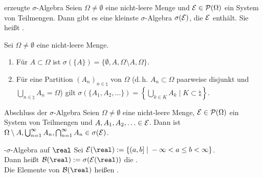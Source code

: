 \begin{Def}{erzeugte $\sigma$-Algebra}
    Seien $\Omega \not= \emptyset$ eine nicht-leere Menge und $\mathcal{E} \in \mathcal{P}(\Omega)$ ein
    System von Teilmengen.
    Dann gibt es eine kleinste $\sigma$-Algebra $\sigma(\mathcal{E})$, die $\mathcal{E}$ enthält.
    Sie heißt .
\end{Def}

\begin{Bsp}
    Sei $\Omega \not= \emptyset$ eine nicht-leere Menge.
    \begin{enumerate}
        \item
        Für $A \subset \Omega$ ist $\sigma(\{A\}) = \{\emptyset, A, \Omega \setminus A, \Omega\}$.

        \item
        Für eine Partition $(A_n)_{n \in \natural}$ von $\Omega$
        (d.\,h. $A_n \subset \Omega$ paarweise disjunkt und
        $\bigcup_{n \in \natural} A_n = \Omega$) gilt
        $\sigma(\{A_1, A_2, \dotsc\}) = \left\{\bigcup_{k \in K} A_k \;|\;
        K \subset \natural\right\}$.
    \end{enumerate}
\end{Bsp}

\begin{Satz}{Abschluss der $\sigma$-Algebra}
    Seien $\Omega \not= \emptyset$ eine nicht-leere Menge, $\mathcal{E} \in \mathcal{P}(\Omega)$ ein
    System von Teilmengen und $A, A_1, A_2, \dotsc \in \mathcal{E}$.
    Dann ist $\Omega \setminus A, \bigcup_{n=1}^\infty A_n,
    \bigcap_{n=1}^\infty A_n \in \sigma(\mathcal{E})$.
\end{Satz}

\linie

\begin{Def}{-$\sigma$-Algebra auf $\real$}
    Sei $\E(\real) := \{(a, b] \;|\; -\infty < a \le b < \infty\}$.\\
    Dann heißt $\B(\real) := \sigma(\E(\real))$ die
    .\\
    Die Elemente von $\B(\real)$ heißen .
\end{Def}

